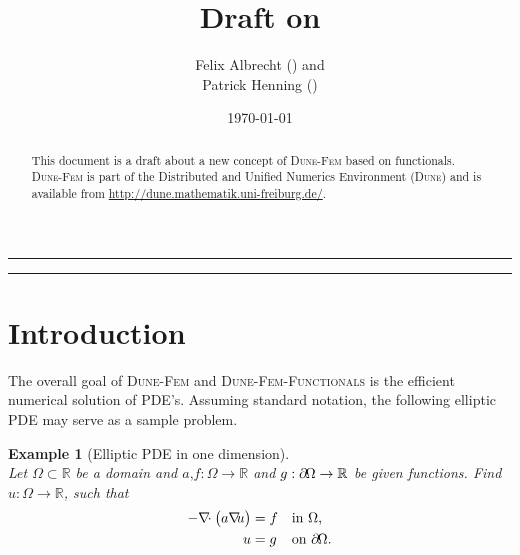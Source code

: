 \documentclass[a4paper,11pt]{article}
\title{Draft on \dunefemfunctionals}
\author{Felix Albrecht (\Code{felix.albrecht@uni-muenster.de}) and\\
  Patrick Henning (\Code{patrick.henning@uni-muenster.de})
}
\date{\today}
\numberwithin{equation}{section}
\newtheorem{example}[definition]{Example}
\newcommand{\theoremNewline}{\hspace{1mm}\\}
\newcommand{\theoremEndLine}{\hspace{1mm}}
\newcommand{\dune}{\textsc{Dune}\xspace}
\newcommand{\dunefem}{\textsc{Dune-Fem}\xspace}
\newcommand{\dunefemfunctionals}{\textsc{Dune-Fem-Functionals}\xspace}
\newcommand{\hnS}{\hspace{-1.25pt}}
\newcommand{\divergence}{\nabla\hnS\hnS\hnS\cdot}
\newcommand{\gradient}{\nabla\hnS\hnS}
\newcommand{\boundary}{\partial \hnS}
\newcommand{\komma}{\text{,}}
\newcommand{\punkt}{\text{.}}
\newcommand{\R}{\mathbb{R}}
\begin{document}
  \maketitle

  \begin{abstract}
    This document is a draft about a new concept of \dunefem based on functionals. \dunefem is part of the
    Distributed and Unified Numerics Environment (\dune) and is available from
    \url{http://dune.mathematik.uni-freiburg.de/}.
  \end{abstract}

  \hrule

  \begin{small}
    \tableofcontents
  \end{small}

  \vspace{5mm}
  \hrule

  \section{Introduction}
    \label{section::introduction}

    The overall goal of \dunefem and \dunefemfunctionals is the efficient numerical solution of PDE's. Assuming standard
    notation, the following elliptic PDE may serve as a sample problem.

    \begin{example}[Elliptic PDE in one dimension]\theoremNewline
      \label{example::introduction::elliptic_pde}
      Let ${\Omega \subset \R}$ be a domain and ${a\komma f : \Omega \rightarrow \R}$ and
      ${g : \boundary\Omega \rightarrow \R}$ be given functions. Find ${u: \Omega \rightarrow \R}$, such that
      \begin{align}
        \label{equation::introduction::elliptic_pde}
        - \divergence
          \big(
            a \gradient u
          \big)
          &= f &&\text{in } \Omega \komma
        \\
        u &= g &&\text{on } \boundary\Omega \punkt
        \notag
      \end{align}
    \end{example}\theoremEndLine
\end{document}
